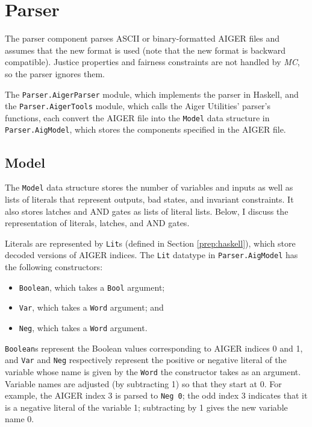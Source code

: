 \documentclass[12pt,a4paper,twoside,openright]{report}
\begin{document}
{{\section{Parser}
\label{impl:aiger}

The parser component parses ASCII or binary-formatted AIGER files and
assumes that the new format is used
(note that the new format is backward compatible).
Justice properties and fairness constraints are not handled by \emph{MC}, so
the parser ignores them.

The \verb,Parser.AigerParser, module, which implements the parser in Haskell, and
the \verb,Parser.AigerTools, module, which calls the Aiger Utilities' parser's functions,
each convert the AIGER file into the \verb,Model, data structure in \verb,Parser.AigModel,,
which stores the components specified in the AIGER file.

\subsection{Model}

The \verb,Model, data structure stores the number of variables and
inputs as well as lists of literals that represent outputs, bad states,
and invariant constraints. It also stores latches and AND gates as
lists of literal lists. Below, I discuss the representation of literals, latches, and
AND gates.

Literals are represented by \verb,Lit,s (defined in Section \ref{prep:haskell}),
which store decoded versions of AIGER indices. The {\tt Lit} datatype
in {\tt Parser.AigModel} has the following constructors:
\begin{itemize}
\item \verb,Boolean,, which takes a \verb,Bool, argument;
\item \verb,Var,, which takes a \verb,Word, argument; and
\item \verb,Neg,, which takes a \verb,Word, argument.
\end{itemize}
\verb,Boolean,s represent the Boolean values corresponding to AIGER indices 0 and 1,
and \verb,Var, and \verb,Neg, respectively represent the positive or negative literal
of the variable whose name is given by the \verb,Word, the constructor takes as an
argument.
Variable names are adjusted (by subtracting 1) so that they start at 0.
For example, the AIGER index 3 is parsed to \verb,Neg 0,;
the odd index 3 indicates that it is a negative literal of the variable 1;
subtracting by 1 gives the new variable name 0.

}}
\end{document}
